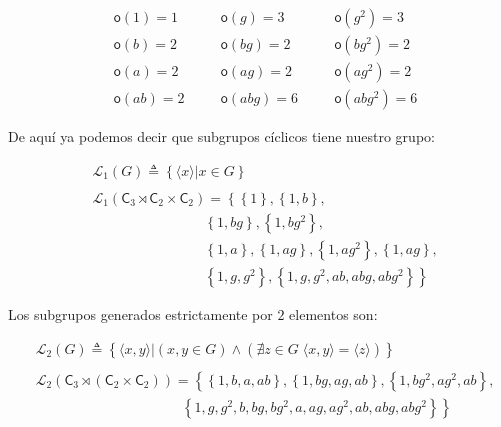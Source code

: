 \documentclass[12pt,a4paper,fleqn,spanish,final,openright]{extbook}
\theoremstyle{definition}
\theoremstyle{remark}
\begin{document}
\begin{align*}
&\mathsf{o}{\left({1}\right)} = 1\quad &&\mathsf{o}{\left({g}\right)} = 3\quad &&\mathsf{o}{\left({g^2}\right)} = 3\\
&\mathsf{o}{\left({b}\right)} = 2\quad &&\mathsf{o}{\left({bg}\right)} = 2\quad &&\mathsf{o}{\left({bg^2}\right)} = 2\\
&\mathsf{o}{\left({a}\right)} = 2\quad &&\mathsf{o}{\left({ag}\right)} = 2\quad &&\mathsf{o}{\left({ag^2}\right)} = 2\\
&\mathsf{o}{\left({ab}\right)} = 2\quad &&\mathsf{o}{\left({abg}\right)} = 6\quad &&\mathsf{o}{\left({abg^2}\right)} = 6
\end{align*}

De aquí ya podemos decir que subgrupos cíclicos tiene nuestro grupo:

\begin{align*}
&{\mathcal{L}_{1}}{\left({G}\right)}\triangleq{\left\lbrace{\langle x \rangle\vert x   \in G}\right\rbrace}\\
&\\
&{\mathcal{L}_{1}}{\left({{\mathsf{C}_{3}}\rtimes{\mathsf{C}_{2}   \times   \mathsf{C}_{2}}}\right)} = {\left\lbrace\right.}
{\left\lbrace{1}\right\rbrace},{\left\lbrace{1,b}\right\rbrace},\\
&\qquad\qquad\qquad\qquad{\left\lbrace{1,bg}\right\rbrace},
{\left\lbrace{1,bg^2}\right\rbrace},\\
&\qquad\qquad\qquad\qquad{\left\lbrace{1,a}\right\rbrace},
{\left\lbrace{1,ag}\right\rbrace},
{\left\lbrace{1,ag^2}\right\rbrace},
{\left\lbrace{1,ag}\right\rbrace},\\
&\qquad\qquad\qquad\qquad{\left\lbrace{1,g,g^2}\right\rbrace},
{\left\lbrace{1,g,g^2,ab,abg,abg^2}\right\rbrace}{\left.\right\rbrace}
\end{align*}

Los subgrupos generados estrictamente por $2$ elementos son:

\begin{align*}
&{\mathcal{L}_{2}}{\left({G}\right)}\triangleq
{\left\lbrace{
\langle x,y \rangle
\vert
(x,y   \in G)    \wedge    (   \nexists    z    \in G \;\langle x,y \rangle = \langle z\rangle)
}\right\rbrace}\\
&\\
&{\mathcal{L}_{2}}{\left({{\mathsf{C}_3}\rtimes{({\mathsf{C}_{2}}   \times   {\mathsf{C}_{2}})}}\right)}=\left\lbrace\right.
{\left\lbrace{1,b,a,ab}\right\rbrace},
{\left\lbrace{1,bg,ag,ab}\right\rbrace},
{\left\lbrace{1,bg^2,ag^2,ab}\right\rbrace},\\
&\qquad\qquad\qquad\qquad\qquad\;\,{\left\lbrace{1,g,g^2,b,bg,bg^2,a,ag,ag^2,ab,abg,abg^2}\right\rbrace}
\left.\right\rbrace
\end{align*}
\end{document}
